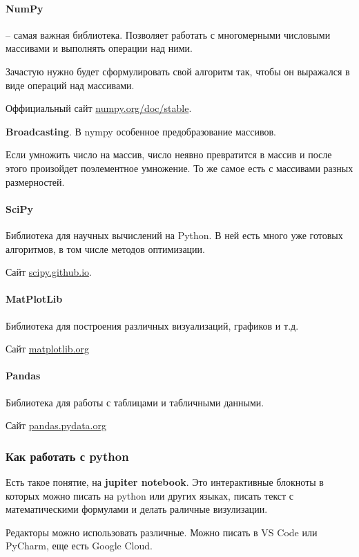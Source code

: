 \paragraph{NumPy} -- самая важная библиотека.
Позволяет работать с многомерными числовыми массивами и выполнять операции над ними.

Зачастую нужно будет сформулировать свой алгоритм так, чтобы он выражался в виде операций над массивами.

Оффициальный сайт \href{https://numpy.org/doc/stable}{numpy.org/doc/stable}.

\textbf{Broadcasting}.
В nympy особенное предобразование массивов.

Если умножить число на массив, число неявно превратится в массив и после этого произойдет поэлементное умножение.
То же самое есть с массивами разных размерностей.

\paragraph{SciPy}
Библиотека для научных вычислений на Python.
В ней есть много уже готовых алгоритмов, в том числе методов оптимизации.

Сайт \href{https://scipy.github.io}{scipy.github.io}.

\paragraph{MatPlotLib}
Библиотека для построения различных визуализаций, графиков и т.д.

Сайт \href{https://matplotlib.org/}{matplotlib.org}

\paragraph{Pandas}
Библиотека для работы с таблицами и табличными данными.

Сайт \href{https://pandas.pydata.org}{pandas.pydata.org}

\subsubsection{Как работать с python}
Есть такое понятие, на \textbf{jupiter notebook}.
Это интерактивные блокноты в которых можно писать на python или других языках,
писать текст с математическими формулами и делать раличные визулизации.

Редакторы можно использовать различные.
Можно писать в VS Code или PyCharm, еще есть Google Cloud.

